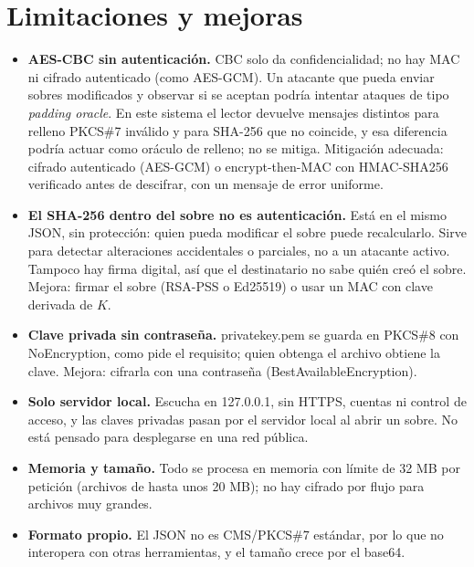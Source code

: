 \documentclass[11pt,a4paper]{article}
\newcommand{\cod}[1]{{\ttfamily\let\_\relax\def\_{\textunderscore\penalty0\hskip0pt\relax}\def\/{\slash\penalty0\hskip0pt\relax}#1}}
\begin{document}
\section{Limitaciones y mejoras}
\begin{itemize}
  \item \textbf{AES-CBC sin autenticación.} CBC solo da confidencialidad; no hay MAC ni cifrado autenticado
    (como AES-GCM). Un atacante que pueda enviar sobres modificados y observar si se aceptan podría intentar
    ataques de tipo \emph{padding oracle}. En este sistema el lector devuelve mensajes distintos para relleno PKCS\#7 inválido y para SHA-256 que no coincide, y esa diferencia podría actuar como oráculo de relleno; no se mitiga. Mitigación adecuada: cifrado autenticado (AES-GCM) o encrypt-then-MAC con HMAC-SHA256 verificado antes de descifrar, con un mensaje de error uniforme.
  \item \textbf{El SHA-256 dentro del sobre no es autenticación.} Está en el mismo JSON, sin protección: quien
    pueda modificar el sobre puede recalcularlo. Sirve para detectar alteraciones accidentales o parciales,
    no a un atacante activo. Tampoco hay firma digital, así que el destinatario no sabe quién creó el sobre.
    Mejora: firmar el sobre (RSA-PSS o Ed25519) o usar un MAC con clave derivada de $K$.
  \item \textbf{Clave privada sin contraseña.} \cod{private\_key.pem} se guarda en PKCS\#8 con
    \cod{NoEncryption}, como pide el requisito; quien obtenga el archivo obtiene la clave. Mejora: cifrarla con
    una contraseña (\cod{BestAvailableEncryption}).
  \item \textbf{Solo servidor local.} Escucha en \cod{127.0.0.1}, sin HTTPS, cuentas ni control de acceso, y
    las claves privadas pasan por el servidor local al abrir un sobre. No está pensado para desplegarse en una
    red pública.
  \item \textbf{Memoria y tamaño.} Todo se procesa en memoria con límite de 32 MB por petición (archivos de
    hasta unos 20 MB); no hay cifrado por flujo para archivos muy grandes.
  \item \textbf{Formato propio.} El JSON no es CMS/PKCS\#7 estándar, por lo que no interopera con otras
    herramientas, y el tamaño crece por el base64.
\end{itemize}
\end{document}
